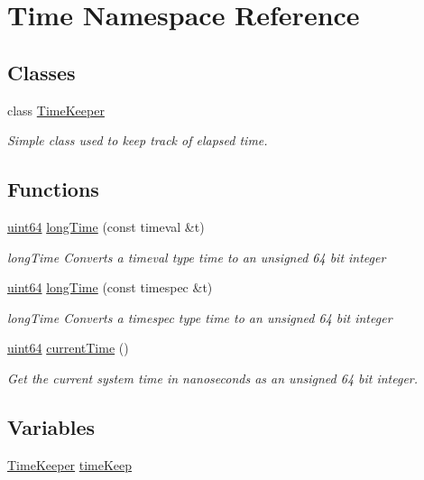 \hypertarget{namespaceTime}{}\section{Time Namespace Reference}
\label{namespaceTime}
\subsection*{Classes}
\begin{DoxyCompactItemize}
\item 
class \hyperlink{classTime_1_1TimeKeeper}{Time\+Keeper}
\begin{DoxyCompactList}\small\item\em Simple class used to keep track of elapsed time. \end{DoxyCompactList}\end{DoxyCompactItemize}
\subsection*{Functions}
\begin{DoxyCompactItemize}
\item 
\hyperlink{systemDefines_8h_abc0f5bc07737e498f287334775dff2b6}{uint64} \hyperlink{namespaceTime_a57ff57387f9a60589ccdbe9215843ffe}{long\+Time} (const timeval \&t)
\begin{DoxyCompactList}\small\item\em long\+Time Converts a timeval type time to an unsigned 64 bit integer \end{DoxyCompactList}\item 
\hyperlink{systemDefines_8h_abc0f5bc07737e498f287334775dff2b6}{uint64} \hyperlink{namespaceTime_a17419cc5dad406abf846351b1a75bd48}{long\+Time} (const timespec \&t)
\begin{DoxyCompactList}\small\item\em long\+Time Converts a timespec type time to an unsigned 64 bit integer \end{DoxyCompactList}\item 
\hyperlink{systemDefines_8h_abc0f5bc07737e498f287334775dff2b6}{uint64} \hyperlink{namespaceTime_ae414566445c9d392bb148cc98fe2cece}{current\+Time} ()
\begin{DoxyCompactList}\small\item\em Get the current system time in nanoseconds as an unsigned 64 bit integer. \end{DoxyCompactList}\end{DoxyCompactItemize}
\subsection*{Variables}
\begin{DoxyCompactItemize}
\item 
\hyperlink{classTime_1_1TimeKeeper}{Time\+Keeper} \hyperlink{namespaceTime_a321ca5eba84577aaaaeb2a79d28806c8}{time\+Keep}
\end{DoxyCompactItemize}



